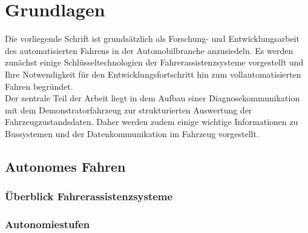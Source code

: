 \chapter{Grundlagen} \label{cha:grundlagen}
Die vorliegende Schrift ist grundsätzlich als Forschung- und Entwicklungsarbeit des automatisierten Fahrens in der Automobilbranche anzusiedeln. Es werden zunächst einige Schlüsseltechnologien der Fahrerassistenzsysteme vorgestellt und Ihre Notwendigkeit für den Entwicklungsfortschritt hin zum vollautomatisierten Fahren begründet.\\
Der zentrale Teil der Arbeit liegt in dem Aufbau einer Diagnosekommunikation mit dem Demonstratorfahrzeug zur strukturierten Auswertung der Fahrzeugzustandsdaten. Daher werden zudem einige wichtige Informationen zu Bussystemen und der Datenkommunikation im Fahrzeug vorgestellt.


\section{Autonomes Fahren} \label{sec:AutonomesFahren}

\subsection{Überblick Fahrerassistenzsysteme} \label{subsec:FAS}
\lipsum[1-1]
\subsection{Autonomiestufen} \label{Autonomiestufen}%
\lipsum[1-1]


